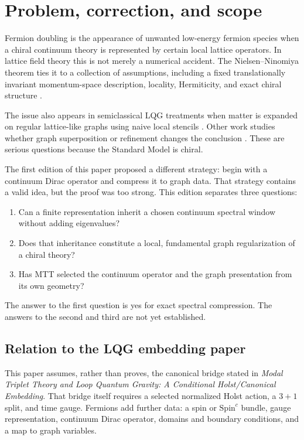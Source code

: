 \documentclass[11pt]{article}
\begin{document}
\tableofcontents

\section{Problem, correction, and scope}

Fermion doubling is the appearance of unwanted low-energy fermion species
when a chiral continuum theory is represented by certain local lattice
operators. In lattice field theory this is not merely a numerical accident.
The Nielsen--Ninomiya theorem ties it to a collection of assumptions,
including a fixed translationally invariant momentum-space description,
locality, Hermiticity, and exact chiral structure
\cite{NielsenNinomiya}.

The issue also appears in semiclassical LQG treatments when matter is expanded
on regular lattice-like graphs using naive local stencils
\cite{BarnettSmolin2015}. Other work studies whether graph superposition or
refinement changes the conclusion \cite{GambiniPullin2015,ZhangLiuHan2022}.
These are serious questions because the Standard Model is chiral.

The first edition of this paper proposed a different strategy: begin with a
continuum Dirac operator and compress it to graph data. That strategy contains
a valid idea, but the proof was too strong. This edition separates three
questions:
\begin{enumerate}
\item Can a finite representation inherit a chosen continuum spectral window
  without adding eigenvalues?
\item Does that inheritance constitute a local, fundamental graph
  regularization of a chiral theory?
\item Has MTT selected the continuum operator and the graph presentation from
  its own geometry?
\end{enumerate}
The answer to the first question is yes for exact spectral compression. The
answers to the second and third are not yet established.

\subsection{Relation to the LQG embedding paper}

This paper assumes, rather than proves, the canonical bridge stated in
\emph{Modal Triplet Theory and Loop Quantum Gravity: A Conditional
Holst/Canonical Embedding}. That bridge itself requires a selected normalized
Holst action, a \(3+1\) split, and time gauge. Fermions add further data:
a spin or \(\mathrm{Spin}^c\) bundle, gauge representation, continuum Dirac
operator, domains and boundary conditions, and a map to graph variables.
\end{document}
